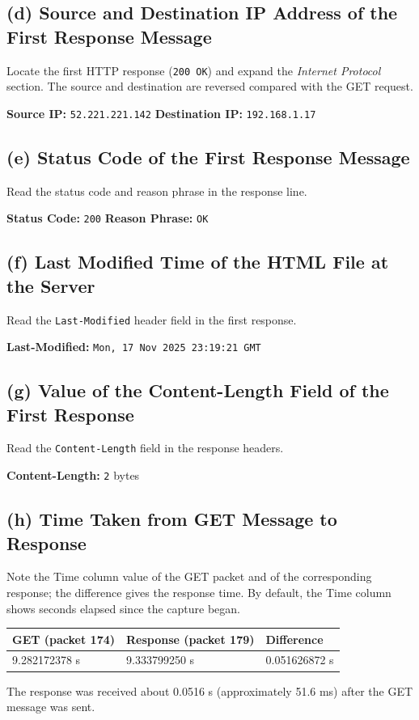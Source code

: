 \documentclass[12pt,a4paper]{article}
\begin{document}
	\subsection*{(d) Source and Destination IP Address of the First Response Message}
	Locate the first HTTP response (\texttt{200 OK}) and expand the \textit{Internet Protocol} section. The source and destination are reversed compared with the GET request.
	
	\textbf{Source IP:} \texttt{52.221.221.142} \hfill \textbf{Destination IP:} \texttt{192.168.1.17}
	
	\subsection*{(e) Status Code of the First Response Message}
	Read the status code and reason phrase in the response line.
	
	\textbf{Status Code:} \texttt{200} \hfill \textbf{Reason Phrase:} \texttt{OK}
	
	\subsection*{(f) Last Modified Time of the HTML File at the Server}
	Read the \texttt{Last-Modified} header field in the first response.
	
	\textbf{Last-Modified:} \texttt{Mon, 17 Nov 2025 23:19:21 GMT}
	
	\subsection*{(g) Value of the Content-Length Field of the First Response}
	Read the \texttt{Content-Length} field in the response headers.
	
	\textbf{Content-Length:} \texttt{2} bytes
	
	\subsection*{(h) Time Taken from GET Message to Response}
	Note the Time column value of the GET packet and of the corresponding response; the difference gives the response time. By default, the Time column shows seconds elapsed since the capture began.
	
	\begin{center}
		\begin{tabular}{|l|l|l|}
			\hline
			\textbf{GET (packet 174)} & \textbf{Response (packet 179)} & \textbf{Difference} \\ \hline
			9.282172378 s & 9.333799250 s & 0.051626872 s \\ \hline
		\end{tabular}
	\end{center}
	The response was received about 0.0516 s (approximately 51.6 ms) after the GET message was sent.
	
\end{document}
